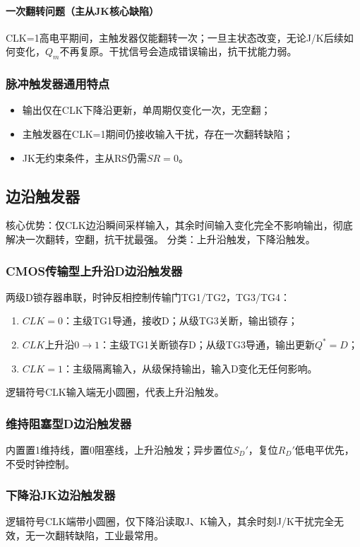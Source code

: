 \paragraph{一次翻转问题（主从JK核心缺陷）}
CLK=1高电平期间，主触发器仅能翻转一次；一旦主状态改变，无论J/K后续如何变化，$Q_m$不再复原。干扰信号会造成错误输出，抗干扰能力弱。

\subsubsection{脉冲触发器通用特点}
\begin{itemize}
    \item 输出仅在CLK下降沿更新，单周期仅变化一次，无空翻；
    \item 主触发器在CLK=1期间仍接收输入干扰，存在一次翻转缺陷；
    \item JK无约束条件，主从RS仍需$SR=0$。
\end{itemize}

\subsection{边沿触发器}
核心优势：仅CLK边沿瞬间采样输入，其余时间输入变化完全不影响输出，彻底解决一次翻转，空翻，抗干扰最强。
分类：上升沿触发，下降沿触发。

\subsubsection{CMOS传输型上升沿D边沿触发器}
两级D锁存器串联，时钟反相控制传输门TG1/TG2，TG3/TG4：
\begin{enumerate}
    \item $CLK=0$：主级TG1导通，接收D；从级TG3关断，输出锁存；
    \item $CLK$上升沿$0\rightarrow1$：主级TG1关断锁存D；从级TG3导通，输出更新$Q^*=D$；
    \item $CLK=1$：主级隔离输入，从级保持输出，输入D变化无任何影响。
\end{enumerate}
逻辑符号CLK输入端无小圆圈，代表上升沿触发。

\subsubsection{维持阻塞型D边沿触发器}
内置置1维持线，置0阻塞线，上升沿触发；异步置位$S_D'$，复位$R_D'$低电平优先，不受时钟控制。

\subsubsection{下降沿JK边沿触发器}
逻辑符号CLK端带小圆圈，仅下降沿读取J、K输入，其余时刻J/K干扰完全无效，无一次翻转缺陷，工业最常用。

